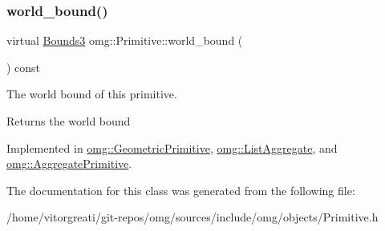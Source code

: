 \mbox{\label{classomg_1_1_primitive_a457b29547bc918cf8874b24f5168ff86}} 
\subsubsection{\texorpdfstring{world\_bound()}{world\_bound()}}
{\footnotesize\ttfamily virtual \mbox{\hyperlink{classomg_1_1_bounds3}{Bounds3}} omg\+::\+Primitive\+::world\+\_\+bound (\begin{DoxyParamCaption}{ }\end{DoxyParamCaption}) const\hspace{0.3cm}{\ttfamily [pure virtual]}}



The world bound of this primitive. 

\begin{DoxyReturn}{Returns}
the world bound 
\end{DoxyReturn}


Implemented in \mbox{\hyperlink{classomg_1_1_geometric_primitive_ae8f0945c180c43e32cad4faa75185522}{omg\+::\+Geometric\+Primitive}}, \mbox{\hyperlink{classomg_1_1_list_aggregate_a8c7b3a6c7c8a087355a1a35519c79555}{omg\+::\+List\+Aggregate}}, and \mbox{\hyperlink{classomg_1_1_aggregate_primitive_ad8a385aaa01354acffad18fe8f23fa25}{omg\+::\+Aggregate\+Primitive}}.



The documentation for this class was generated from the following file\+:\begin{DoxyCompactItemize}
\item 
/home/vitorgreati/git-\/repos/omg/sources/include/omg/objects/Primitive.\+h\end{DoxyCompactItemize}
